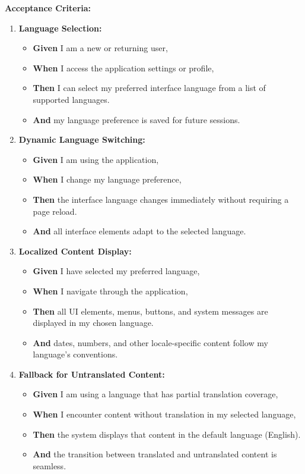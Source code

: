 \documentclass[12pt]{article}
\begin{document}
\vspace{1em}
\textbf{Acceptance Criteria:}
\begin{enumerate}
    \item \textbf{Language Selection:}
    \begin{itemize}
        \item \textbf{Given} I am a new or returning user,
        \item \textbf{When} I access the application settings or profile,
        \item \textbf{Then} I can select my preferred interface language from a list of supported languages.
        \item \textbf{And} my language preference is saved for future sessions.
    \end{itemize}

    \item \textbf{Dynamic Language Switching:}
    \begin{itemize}
        \item \textbf{Given} I am using the application,
        \item \textbf{When} I change my language preference,
        \item \textbf{Then} the interface language changes immediately without requiring a page reload.
        \item \textbf{And} all interface elements adapt to the selected language.
    \end{itemize}

    \item \textbf{Localized Content Display:}
    \begin{itemize}
        \item \textbf{Given} I have selected my preferred language,
        \item \textbf{When} I navigate through the application,
        \item \textbf{Then} all UI elements, menus, buttons, and system messages are displayed in my chosen language.
        \item \textbf{And} dates, numbers, and other locale-specific content follow my language's conventions.
    \end{itemize}

    \item \textbf{Fallback for Untranslated Content:}
    \begin{itemize}
        \item \textbf{Given} I am using a language that has partial translation coverage,
        \item \textbf{When} I encounter content without translation in my selected language,
        \item \textbf{Then} the system displays that content in the default language (English).
        \item \textbf{And} the transition between translated and untranslated content is seamless.
    \end{itemize}


\end{enumerate}
\end{document}
